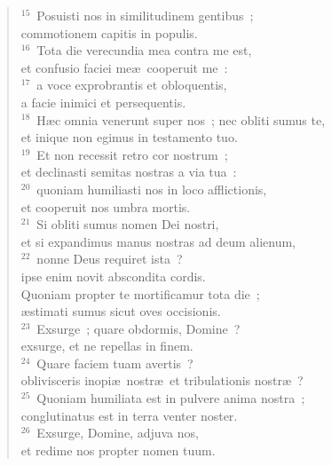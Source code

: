 \begin{flushleft}
\begin{verse}
${}^{15}$~Posuisti nos in similitudinem gentibus~;\\ commotionem capitis in populis.\\
${}^{16}$~Tota die verecundia mea contra me est,\\ et confusio faciei me\ae\ cooperuit me~:\\
${}^{17}$~a voce exprobrantis et obloquentis,\\ a facie inimici et persequentis.\\
${}^{18}$~H\ae c omnia venerunt super nos~; nec obliti sumus te,\\ et inique non egimus in testamento tuo.\\
${}^{19}$~Et non recessit retro cor nostrum~;\\ et declinasti semitas nostras a via tua~:\\
${}^{20}$~quoniam humiliasti nos in loco afflictionis,\\ et cooperuit nos umbra mortis.\\
${}^{21}$~Si obliti sumus nomen Dei nostri,\\ et si expandimus manus nostras ad deum alienum,\\
${}^{22}$~nonne Deus requiret ista~?\\ ipse enim novit abscondita cordis.\\ Quoniam propter te mortificamur tota die~;\\ \ae stimati sumus sicut oves occisionis.\\
${}^{23}$~Exsurge~; quare obdormis, Domine~?\\ exsurge, et ne repellas in finem.\\
${}^{24}$~Quare faciem tuam avertis~?\\ oblivisceris inopi\ae\ nostr\ae\ et tribulationis nostr\ae~?\\
${}^{25}$~Quoniam humiliata est in pulvere anima nostra~;\\ conglutinatus est in terra venter noster.\\
${}^{26}$~Exsurge, Domine, adjuva nos,\\ et redime nos propter nomen tuum.\end{verse}\end{flushleft}



